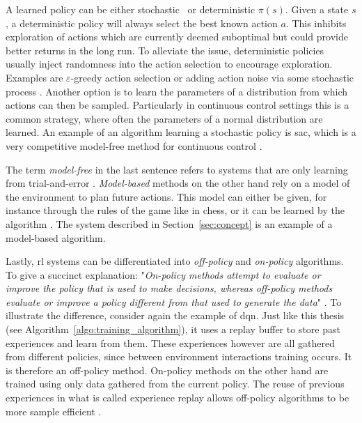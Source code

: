 A learned policy can be either stochastic \piplain\ or deterministic $\pi(s)$. Given a state $s$, a deterministic policy will always select the best known action $a$. This inhibits exploration of actions which are currently deemed suboptimal but could provide better returns in the long run. To alleviate the issue, deterministic policies usually inject randomness into the action selection to encourage exploration. Examples are $\varepsilon$-greedy action selection \cite{mnihHumanlevelControlDeep2015} or adding action noise via some stochastic process \cite{lillicrapContinuousControlDeep2019, silverMasteringGameGo2017}. Another option is to learn the parameters of a distribution from which actions can then be sampled. Particularly in continuous control settings this is a common strategy, where often the parameters of a normal distribution are learned. An example of an algorithm learning a stochastic policy is \gls{sac}, which is a very competitive model-free method for continuous control \cite{haarnojaSoftActorCriticOffPolicy2018}.

The term \emph{model-free} in the last sentence refers to systems that are only learning from trial-and-error \cite{suttonReinforcementLearningIntroduction2018}. \emph{Model-based} methods on the other hand rely on a model of the environment to plan future actions. This model can either be given, for instance through the rules of the game like in chess, or it can be learned by the algorithm \cite{suttonReinforcementLearningIntroduction2018}. The system described in Section~\ref{sec:concept} is an example of a model-based algorithm.

Lastly, \gls{rl} systems can be differentiated into \emph{off-policy} and \emph{on-policy} algorithms. To give a succinct explanation: "\emph{On-policy methods attempt to evaluate or improve the policy that is used to make decisions, whereas off-policy methods evaluate or improve a policy different from that used to generate the data}" \cite{suttonReinforcementLearningIntroduction2018}. To illustrate the difference, consider again the example of \gls{dqn}. Just like this thesis (see Algorithm~\ref{algo:training_algorithm}), it uses a replay buffer to store past experiences and learn from them. These experiences however are all gathered from different policies, since between environment interactions training occurs. It is therefore an off-policy method. On-policy methods on the other hand are trained using only data gathered from the current policy. The reuse of previous experiences in what is called experience replay allows off-policy algorithms to be more sample efficient \cite{francois-lavetIntroductionDeepReinforcement2018}.

